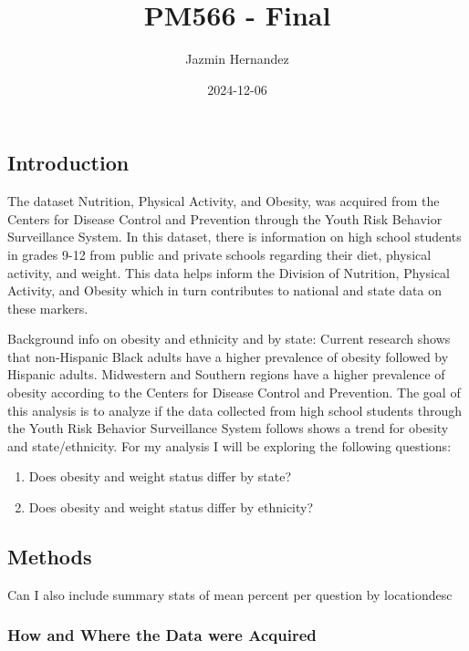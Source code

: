 \documentclass[
  letterpaper,
  DIV=11,
  numbers=noendperiod]{scrartcl}
\title{PM566 - Final}
\author{Jazmin Hernandez}
\date{2024-12-06}
\providecommand{\tightlist}{%
  \setlength{\itemsep}{0pt}\setlength{\parskip}{0pt}}\usepackage{longtable,booktabs,array}
\begin{document}
\maketitle


\subsection{Introduction}\label{introduction}

The dataset Nutrition, Physical Activity, and Obesity, was acquired from
the Centers for Disease Control and Prevention through the Youth Risk
Behavior Surveillance System. In this dataset, there is information on
high school students in grades 9-12 from public and private schools
regarding their diet, physical activity, and weight. This data helps
inform the Division of Nutrition, Physical Activity, and Obesity which
in turn contributes to national and state data on these markers.

Background info on obesity and ethnicity and by state: Current research
shows that non-Hispanic Black adults have a higher prevalence of obesity
followed by Hispanic adults. Midwestern and Southern regions have a
higher prevalence of obesity according to the Centers for Disease
Control and Prevention. The goal of this analysis is to analyze if the
data collected from high school students through the Youth Risk Behavior
Surveillance System follows shows a trend for obesity and
state/ethnicity. For my analysis I will be exploring the following
questions:

\begin{enumerate}
\def\labelenumi{\arabic{enumi})}
\tightlist
\item
  Does obesity and weight status differ by state?
\item
  Does obesity and weight status differ by ethnicity?
\end{enumerate}

\subsection{Methods}\label{methods}

Can I also include summary stats of mean percent per question by
locationdesc

\subsubsection{How and Where the Data were
Acquired}\label{how-and-where-the-data-were-acquired}
\end{document}
